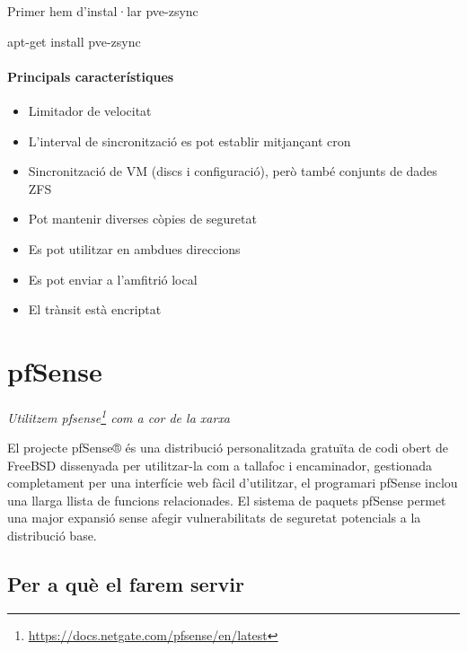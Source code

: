 \documentclass[
  10pt,
]{krantz}
\newenvironment{Shaded}{\begin{snugshade}}{\end{snugshade}}
\newcommand{\ExtensionTok}[1]{#1}
\newcommand{\NormalTok}[1]{#1}
\DeclareRobustCommand{\href}[2]{#2\footnote{\url{#1}}}
\providecommand{\tightlist}{%
  \setlength{\itemsep}{0pt}\setlength{\parskip}{0pt}}
\begin{document}
Primer hem d'instal·lar pve-zsync

\begin{Shaded}
\begin{Highlighting}[]
\ExtensionTok{apt{-}get}\NormalTok{ install pve{-}zsync}
\end{Highlighting}
\end{Shaded}

\hypertarget{principals-caracteruxedstiques}{%
\subsubsection{Principals característiques}\label{principals-caracteruxedstiques}}

\begin{itemize}
\tightlist
\item
  Limitador de velocitat
\item
  L'interval de sincronització es pot establir mitjançant cron
\item
  Sincronització de VM (discs i configuració), però també conjunts de dades ZFS
\item
  Pot mantenir diverses còpies de seguretat
\item
  Es pot utilitzar en ambdues direccions
\item
  Es pot enviar a l'amfitrió local
\item
  El trànsit està encriptat
\end{itemize}

\hypertarget{pfsense}{%
\chapter{pfSense}\label{pfsense}}

\emph{Utilitzem \href{https://docs.netgate.com/pfsense/en/latest}{pfsense} com a cor de la xarxa}

El projecte pfSense® és una distribució personalitzada gratuïta de codi obert de FreeBSD dissenyada per utilitzar-la com a tallafoc i encaminador, gestionada completament per una interfície web fàcil d'utilitzar, el programari pfSense inclou una llarga llista de funcions relacionades. El sistema de paquets pfSense permet una major expansió sense afegir vulnerabilitats de seguretat potencials a la distribució base.

\hypertarget{per-a-quuxe8-el-farem-servir}{%
\section{Per a què el farem servir}\label{per-a-quuxe8-el-farem-servir}}
\end{document}
